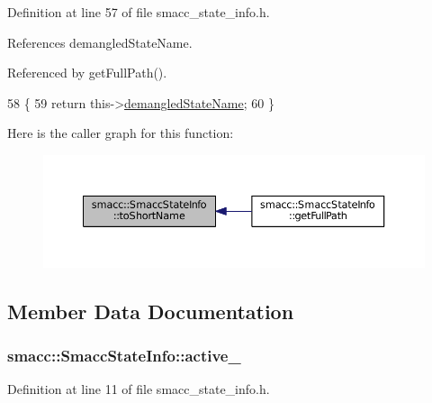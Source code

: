 Definition at line 57 of file smacc\+\_\+state\+\_\+info.\+h.



References demangled\+State\+Name.



Referenced by get\+Full\+Path().


\begin{DoxyCode}
58     \{
59         \textcolor{keywordflow}{return} this->\hyperlink{classsmacc_1_1SmaccStateInfo_ad36e29f3984e40d36664567f9703239a}{demangledStateName};
60     \}
\end{DoxyCode}


Here is the caller graph for this function\+:
\nopagebreak
\begin{figure}[H]
\begin{center}
\leavevmode
\includegraphics[width=350pt]{classsmacc_1_1SmaccStateInfo_aaf6bc4ece87872a5c0072a5582019e20_icgraph}
\end{center}
\end{figure}




\subsection{Member Data Documentation}
\subsubsection[{\texorpdfstring{active\+\_\+}{active_}}]{ smacc\+::\+Smacc\+State\+Info\+::active\+\_\+}\hypertarget{classsmacc_1_1SmaccStateInfo_a12b5db7f92c7d1bbef492b6f33d2680d}{}\label{classsmacc_1_1SmaccStateInfo_a12b5db7f92c7d1bbef492b6f33d2680d}


Definition at line 11 of file smacc\+\_\+state\+\_\+info.\+h.

